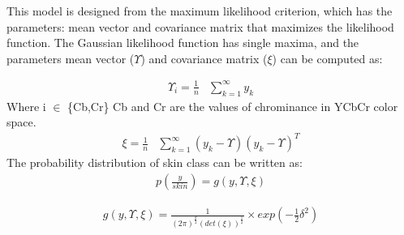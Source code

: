 \documentclass[conference]{IEEEtran}
\begin{document}
This model is designed from the maximum likelihood criterion, which has the parameters: mean vector and covariance matrix that maximizes the likelihood function. The Gaussian likelihood function\cite{vishwakarma2015efficient} has single maxima, and the parameters mean vector ($\Upsilon$) and covariance matrix ($\xi$) can be computed as:

\begin{equation}
\begin{aligned}
\Upsilon_i = \frac{1}{n} & \sum_{k=1}^\infty y_k
\end{aligned}
\end{equation}
Where i $\in$ \{Cb,Cr\}  Cb and Cr are the values of chrominance in YCbCr color space.
\begin{equation}
\begin{aligned}
\xi = \frac{1}{n} & \sum_{k=1}^\infty \left(y_k - \Upsilon \right)\left(y_k - \Upsilon \right)^T
\end{aligned}
\end{equation}
The probability distribution of skin class can be written as:
\begin{equation}
\begin{aligned}
p(\frac{y}{skin}) =  g(y,\Upsilon,\xi)
\end{aligned}
\end{equation}

\begin{equation}
\begin{aligned}
g(y,\Upsilon,\xi) =  \frac{1}{(2\pi)^{\frac{d}{2}}\left(det\left(\xi \right)\right)^\frac{1}{2}} \times exp(-\frac{1}{2}\delta^2)
\end{aligned}
\end{equation}
\end{document}
